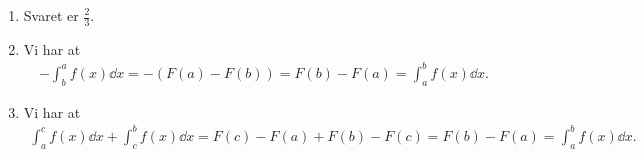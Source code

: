 \begin{enumerate}
	
	\item Svaret er $\frac{2}{3}$.
	
	\item \label{it:bes3ans} Vi har at 
	\begin{align*}
	-\int_{b}^{a} f(x) \dd x=-(F(a)-F(b))=F(b)-F(a)=\int_{a}^{b} f(x)\dd x.
	\end{align*}
	
	\item \label{it:best2ans} Vi har at
	\begin{align*}
	\int_a^c f(x)\dd x+\int_c^b f(x)\dd x=F(c)-F(a)+F(b)-F(c)=F(b)-F(a)=\int_{a}^{b} f(x)\dd x.
	\end{align*}
	
	
	
\end{enumerate}